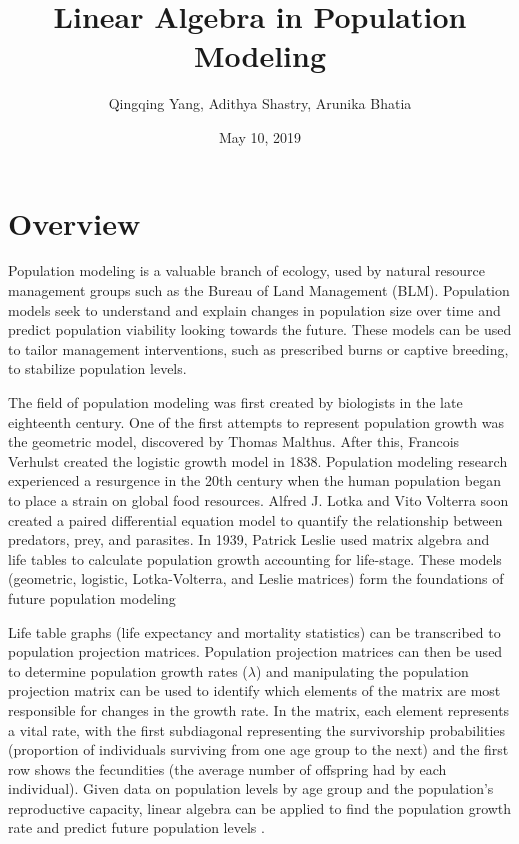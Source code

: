 \documentclass[12pt]{article}
\title{Linear Algebra in Population Modeling}
\author{Qingqing Yang, Adithya Shastry, Arunika Bhatia}
\date{May 10, 2019}
\begin{document}
\doublespacing
\maketitle
\newpage

\section{Overview}

Population modeling is a valuable branch of ecology, used by natural resource management groups such as the Bureau of Land Management (BLM). Population models seek to understand and explain changes in population size over time and predict population viability looking towards the future. These models can be used to tailor management interventions, such as prescribed burns or captive breeding, to stabilize population levels.

The field of population modeling was first created by biologists in the late eighteenth century. One of the first attempts to represent population growth was the geometric model, discovered by Thomas Malthus. After this, Francois Verhulst created the logistic growth model in 1838. Population modeling research experienced a resurgence in the 20th century when the human population began to place a strain on global food resources. Alfred J. Lotka and Vito Volterra soon created a paired differential equation model to quantify the relationship between predators, prey, and parasites. In 1939, Patrick Leslie used matrix algebra and life tables to calculate population growth accounting for life-stage. These models (geometric, logistic, Lotka-Volterra, and Leslie matrices) form the foundations of future population modeling \cite{national}

Life table graphs (life expectancy and mortality statistics) can be transcribed to population projection matrices.  Population projection matrices can then be used to determine population growth rates ($\lambda$) and manipulating the population projection matrix can be used to identify which elements of the matrix are most responsible for changes in the growth rate. In the matrix, each element represents a vital rate, with the first subdiagonal representing the survivorship probabilities (proportion of individuals surviving from one age group to the next) and the first row shows the fecundities (the average number of offspring had by each individual). Given data on population levels by age group and the population’s reproductive capacity, linear algebra can be applied to find the population growth rate and predict future population levels \cite{smith_geoff_ludwig_2011}.
\end{document}
